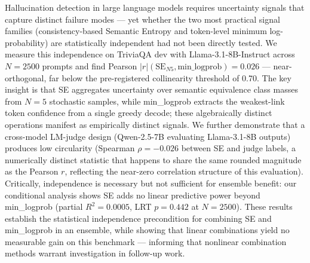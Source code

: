Hallucination detection in large language models requires uncertainty signals that capture distinct failure modes --- yet whether the two most practical signal families (consistency-based Semantic Entropy and token-level minimum log-probability) are statistically independent had not been directly tested. We measure this independence on TriviaQA dev with Llama-3.1-8B-Instruct across $N=2500$ prompts and find Pearson $|r|(\text{SE}_{N5}, \text{min\_logprob}) = 0.026$ --- near-orthogonal, far below the pre-registered collinearity threshold of 0.70. The key insight is that SE aggregates uncertainty over semantic equivalence class masses from $N=5$ stochastic samples, while min\_logprob extracts the weakest-link token confidence from a single greedy decode; these algebraically distinct operations manifest as empirically distinct signals. We further demonstrate that a cross-model LM-judge design (Qwen-2.5-7B evaluating Llama-3.1-8B outputs) produces low circularity (Spearman $\rho = -0.026$ between SE and judge labels, a numerically distinct statistic that happens to share the same rounded magnitude as the Pearson $r$, reflecting the near-zero correlation structure of this evaluation). Critically, independence is necessary but not sufficient for ensemble benefit: our conditional analysis shows SE adds no linear predictive power beyond min\_logprob (partial $R^2=0.0005$, LRT $p=0.442$ at $N=2500$). These results establish the statistical independence precondition for combining SE and min\_logprob in an ensemble, while showing that linear combinations yield no measurable gain on this benchmark --- informing that nonlinear combination methods warrant investigation in follow-up work.
